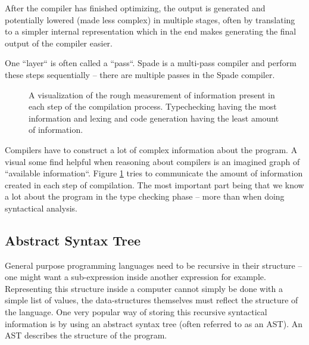 After the compiler has finished optimizing, the output is generated and potentially lowered (made less complex) in multiple stages, often by translating to a simpler internal representation which in the end makes generating the final output of the compiler easier.

One ``layer`` is often called a ``pass``. Spade is a multi-pass compiler and perform these steps sequentially -- there are multiple passes in the Spade compiler.
\cite{src:DragonBook}\cite{src:CraftingInterp}\cite{src:KKLectures}

\begin{figure}
\begin{center}
  \caption{A visualization of the rough measurement of information present in each step of the compilation process. Typechecking having the most information and lexing and code generation having the least amount of information.}
  \label{fig:InformationCompilation}
\end{center}
\end{figure}

Compilers have to construct a lot of complex information about the program. A visual some find helpful when reasoning about compilers is an imagined graph of ``available information``. Figure \ref{fig:InformationCompilation} tries to communicate the amount of information created in each step of compilation. The most important part being that we know a lot about the program in the type checking phase -- more than when doing syntactical analysis.

\subsection{Abstract Syntax Tree}
General purpose programming languages need to be recursive in their structure -- one might want a sub-expression inside another expression for example. Representing this structure inside a computer cannot simply be done with a simple list of values, the data-structures themselves must reflect the structure of the language. One very popular way of storing this recursive syntactical information is by using an abstract syntax tree (often referred to as an AST). An AST describes the structure of the program.


